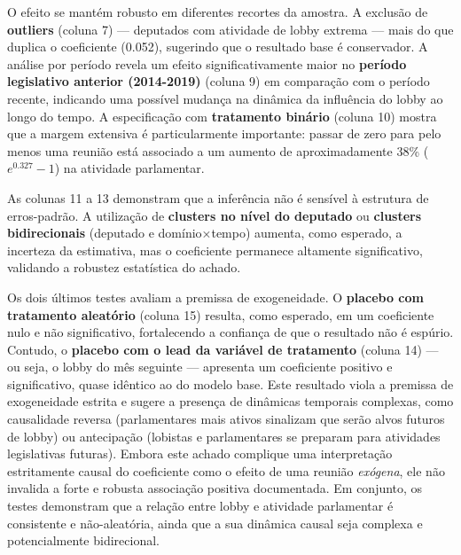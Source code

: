 O efeito se mantém robusto em diferentes recortes da amostra. A exclusão de \textbf{outliers} (coluna 7) — deputados com atividade de lobby extrema — mais do que duplica o coeficiente (0.052), sugerindo que o resultado base é conservador. A análise por período revela um efeito significativamente maior no \textbf{período legislativo anterior (2014-2019)} (coluna 9) em comparação com o período recente, indicando uma possível mudança na dinâmica da influência do lobby ao longo do tempo. A especificação com \textbf{tratamento binário} (coluna 10) mostra que a margem extensiva é particularmente importante: passar de zero para pelo menos uma reunião está associado a um aumento de aproximadamente 38\% ($e^{0.327}-1$) na atividade parlamentar.

As colunas 11 a 13 demonstram que a inferência não é sensível à estrutura de erros-padrão. A utilização de \textbf{clusters no nível do deputado} ou \textbf{clusters bidirecionais} (deputado e domínio×tempo) aumenta, como esperado, a incerteza da estimativa, mas o coeficiente permanece altamente significativo, validando a robustez estatística do achado.

Os dois últimos testes avaliam a premissa de exogeneidade. O \textbf{placebo com tratamento aleatório} (coluna 15) resulta, como esperado, em um coeficiente nulo e não significativo, fortalecendo a confiança de que o resultado não é espúrio. Contudo, o \textbf{placebo com o lead da variável de tratamento} (coluna 14) — ou seja, o lobby do mês seguinte — apresenta um coeficiente positivo e significativo, quase idêntico ao do modelo base. Este resultado viola a premissa de exogeneidade estrita e sugere a presença de dinâmicas temporais complexas, como causalidade reversa (parlamentares mais ativos sinalizam que serão alvos futuros de lobby) ou antecipação (lobistas e parlamentares se preparam para atividades legislativas futuras). Embora este achado complique uma interpretação estritamente causal do coeficiente como o efeito de uma reunião \textit{exógena}, ele não invalida a forte e robusta associação positiva documentada. Em conjunto, os testes demonstram que a relação entre lobby e atividade parlamentar é consistente e não-aleatória, ainda que a sua dinâmica causal seja complexa e potencialmente bidirecional.

